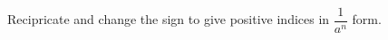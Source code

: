 \documentclass[12pt, a4paper, addpoints]{exam}
\newcommand{\ts}{\vspace{16mm}}
\begin{document}
\begin{questions}
\setlength{\columnsep}{20pt}
\begin{multicols}{6}
\end{multicols}


\ts







\question  Recipricate  and change the sign to give positive indices in $\dfrac{1}{a^n}$  form.
\setlength{\columnsep}{20pt}
\begin{multicols}{6}
\end{multicols}
\end{questions}
\end{document}
